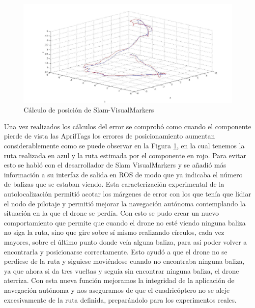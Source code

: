 \begin{figure}[H]
	\begin{center}
		\includegraphics[width=1\textwidth]{imag/IMG48.jpg}
				\caption{Cálculo de posición de Slam-VisualMarkers}
		\label{fig:Comparativa Slam-Visualmarkers.}	
	\end{center}
\end{figure}

\hspace{1cm} Una vez realizados los cálculos del error se comprobó como cuando el componente pierde de vista las AprilTags los errores de posicionamiento aumentan considerablemente como se puede observar en la Figura \ref{fig:Comparativa Slam-Visualmarkers.}, en la cual tenemos la ruta realizada en azul y la ruta estimada por el componente en rojo. Para evitar esto se habló con el desarrollador de Slam VisualMarkers y se añadió más información a su interfaz de salida en ROS de modo que ya indicaba el número de balizas que se estaban viendo. Esta caracterización experimental de la autolocalización permitió acotar los márgenes de error con los que tenía que lidiar el nodo de pilotaje y permitió mejorar la navegación autónoma contemplando la situación en la que el drone se perdía. Con esto se pudo crear un nuevo comportamiento que permite que cuando el drone no esté viendo ninguna baliza no siga la ruta, sino que gire sobre sí mismo realizando círculos, cada vez mayores, sobre el último punto donde veía alguna baliza, para así poder volver a encontrarla y posicionarse correctamente. Esto ayudó a que el drone no se perdiese de la ruta y siguiese moviéndose cuando no encontraba ninguna baliza, ya que ahora si da tres vueltas y seguía sin encontrar ninguna baliza, el drone aterriza. Con esta nueva función mejoramos la integridad de la aplicación de navegación autónoma y nos aseguramos de que el cuadricóptero no se aleje excesivamente de la ruta definida, preparándolo para los experimentos reales.

